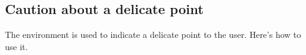 \documentclass[10pt, a4paper]{article}
\begin{document}
\subsection{Caution about a delicate point}

The  environment is used to indicate a delicate point to the user. Here's how to use it.

\end{document}
